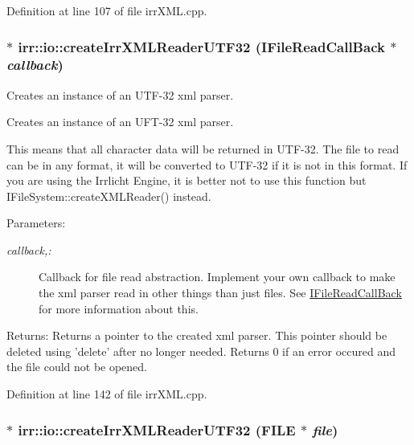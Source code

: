 Definition at line 107 of file irrXML.cpp.\hypertarget{namespaceirr_1_1io_751d8f7391b4b0bc09747ad46b119e28}{
\subsubsection[{createIrrXMLReaderUTF32}]{ $\ast$ irr::io::createIrrXMLReaderUTF32 (IFileReadCallBack $\ast$ {\em callback})}}
\label{namespaceirr_1_1io_751d8f7391b4b0bc09747ad46b119e28}


Creates an instance of an UTF-32 xml parser. 

Creates an instance of an UFT-32 xml parser.

This means that all character data will be returned in UTF-32. The file to read can be in any format, it will be converted to UTF-32 if it is not in this format. If you are using the Irrlicht Engine, it is better not to use this function but IFileSystem::createXMLReader() instead. \begin{Desc}
\item[Parameters:]
\begin{description}
\item[{\em callback,:}]Callback for file read abstraction. Implement your own callback to make the xml parser read in other things than just files. See \hyperlink{classirr_1_1io_1_1_i_file_read_call_back}{IFileReadCallBack} for more information about this. \end{description}
\end{Desc}
\begin{Desc}
\item[Returns:]Returns a pointer to the created xml parser. This pointer should be deleted using 'delete' after no longer needed. Returns 0 if an error occured and the file could not be opened. \end{Desc}


Definition at line 142 of file irrXML.cpp.\hypertarget{namespaceirr_1_1io_6a0c291795bc8b08dc57bb5c6af9893f}{
\subsubsection[{createIrrXMLReaderUTF32}]{ $\ast$ irr::io::createIrrXMLReaderUTF32 (FILE $\ast$ {\em file})}}
\label{namespaceirr_1_1io_6a0c291795bc8b08dc57bb5c6af9893f}


